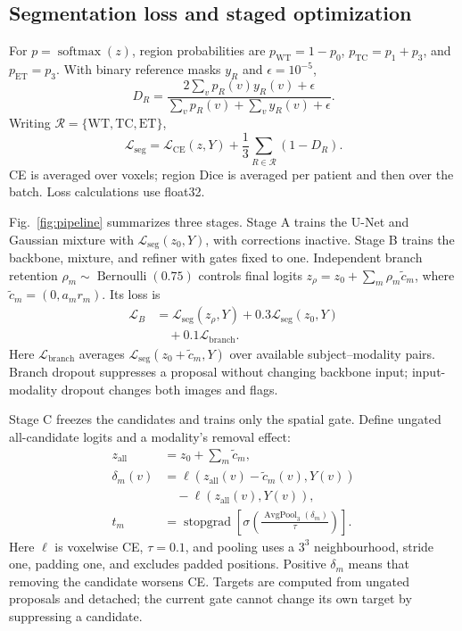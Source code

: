 \documentclass[conference]{IEEEtran}
\begin{document}
\subsection{Segmentation loss and staged optimization}
For $p=\operatorname{softmax}(z)$, region probabilities are $p_{\mathrm{WT}}=1-p_0$, $p_{\mathrm{TC}}=p_1+p_3$, and $p_{\mathrm{ET}}=p_3$. With binary reference masks $y_R$ and $\epsilon=10^{-5}$,
\begin{equation}
D_R=\frac{2\sum_v p_R(v)y_R(v)+\epsilon}
{\sum_v p_R(v)+\sum_v y_R(v)+\epsilon}.
\label{eq:softdice}
\end{equation}
Writing $\mathcal R=\{\mathrm{WT},\mathrm{TC},\mathrm{ET}\}$,
\begin{equation}
\mathcal L_{\mathrm{seg}}=\mathcal L_{\mathrm{CE}}(z,Y)
+\frac{1}{3}\sum_{R\in\mathcal R}(1-D_R).
\label{eq:seg}
\end{equation}
CE is averaged over voxels; region Dice is averaged per patient and then over the batch. Loss calculations use float32.

Fig.~\ref{fig:pipeline} summarizes three stages. Stage A trains the U-Net and Gaussian mixture with $\mathcal L_{\mathrm{seg}}(z_0,Y)$, with corrections inactive. Stage B trains the backbone, mixture, and refiner with gates fixed to one. Independent branch retention $\rho_m\sim\operatorname{Bernoulli}(0.75)$ controls final logits $z_\rho=z_0+\sum_m\rho_m\tilde c_m$, where $\tilde c_m=(0,a_mr_m)$. Its loss is
\begin{equation}
\begin{aligned}
\mathcal L_B&=\mathcal L_{\mathrm{seg}}(z_\rho,Y)
+0.3\mathcal L_{\mathrm{seg}}(z_0,Y)\\
&\quad+0.1\mathcal L_{\mathrm{branch}}.
\end{aligned}
\label{eq:stageb}
\end{equation}
Here $\mathcal L_{\mathrm{branch}}$ averages $\mathcal L_{\mathrm{seg}}(z_0+\tilde c_m,Y)$ over available subject--modality pairs. Branch dropout suppresses a proposal without changing backbone input; input-modality dropout changes both images and flags.

Stage C freezes the candidates and trains only the spatial gate. Define ungated all-candidate logits and a modality's removal effect:
\begin{align}
z_{\mathrm{all}}&=z_0+\sum_m\tilde c_m,\label{eq:candidates}\\
\delta_m(v)&=\ell(z_{\mathrm{all}}(v)-\tilde c_m(v),Y(v))\nonumber\\
&\quad-\ell(z_{\mathrm{all}}(v),Y(v)),\label{eq:delta}\\
t_m&=\operatorname{stopgrad}\!\left[
\sigma\!\left(\frac{\operatorname{AvgPool}_{3}(\delta_m)}{\tau}\right)\right].
\label{eq:utility}
\end{align}
Here $\ell$ is voxelwise CE, $\tau=0.1$, and pooling uses a $3^3$ neighbourhood, stride one, padding one, and excludes padded positions. Positive $\delta_m$ means that removing the candidate worsens CE. Targets are computed from ungated proposals and detached; the current gate cannot change its own target by suppressing a candidate.
\end{document}
